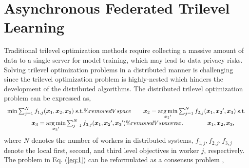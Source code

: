 \documentclass[letterpaper]{article} %
\begin{document}
\section{Asynchronous Federated Trilevel Learning}
Traditional trilevel optimization methods require collecting a massive amount of data to a single server for model training, which may lead to data privacy risks. Solving trilevel optimization problems in a distributed manner is challenging since the trilevel optimization problem is highly-nested which hinders the development of the distributed algorithms.
The distributed trilevel optimization problem can be expressed as,
\begin{equation}
\label{eq:1}
\begin{array}{l}
\min \sum\nolimits_{j = 1}^N {{f_{1,j}}({\boldsymbol{x}_1},{\boldsymbol{x}_2},{\boldsymbol{x}_3})} \;{\rm{s}}.{\rm{t}}. \%removedVspace
\qquad {\boldsymbol{x}_2} = \mathop {\arg \min }\limits_{{\boldsymbol{x}_2}'} \sum\nolimits_{j = 1}^N {{f_{2,j}}({\boldsymbol{x}_1},{\boldsymbol{x}_2}',{\boldsymbol{x}_3})} \;{\rm{s}}.{\rm{t}}. \\
\qquad \qquad {\boldsymbol{x}_3} = \mathop {\arg \min }\limits_{{\boldsymbol{x}_3}'} \sum\nolimits_{j = 1}^N {{f_{3,j}}({\boldsymbol{x}_1},{\boldsymbol{x}_2}',{\boldsymbol{x}_3}')} \%removedVspace
{\mathop{\rm var}}. \qquad \qquad {\boldsymbol{x}_1},{\boldsymbol{x}_2},{\boldsymbol{x}_3},
\end{array}
\end{equation}
where $N$ denotes the number of workers in distributed systems, $f_{1,j}, f_{2,j}, f_{3,j}$ denote the local first, second, and third level objectives in worker $j$, respectively. The problem in Eq. (\ref{eq:1}) can be reformulated as a consensus problem \cite{zhang2014asynchronous,jiao2022distributed},
\end{document}
